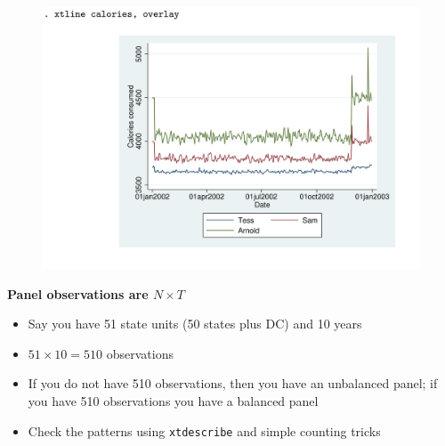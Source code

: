 \documentclass[notes=show]{beamer}
\begin{document}
\begin{frame}[plain]

\begin{figure}
\centering
\includegraphics[scale=0.1]{./lecture_includes/panel_calories_b.png}
\end{figure}

\end{frame}

\begin{frame}[plain]
\begin{center}
\textbf{Panel observations are $N \times T$}
\end{center}

\begin{itemize}
\item Say you have 51 state units (50 states plus DC) and 10 years
\item $51 \times 10 = 510$ observations
\item If you do not have 510 observations, then you have an unbalanced panel; if you have 510 observations you have a balanced panel
\item Check the patterns using \texttt{xtdescribe} and simple counting tricks
\end{itemize}

\end{frame}
\end{document}
